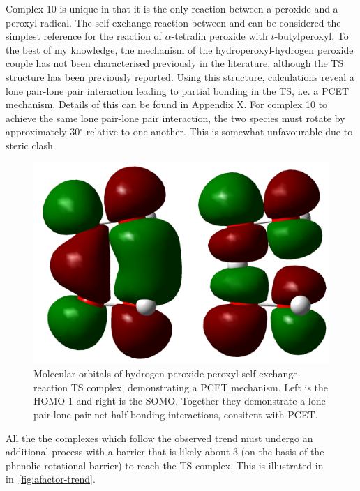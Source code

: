 Complex 10 is unique in that it is the only reaction between a peroxide and a peroxyl radical. The self-exchange reaction between  and  can be considered the simplest reference for the reaction of $\alpha$-tetralin peroxide with $t$-butylperoxyl. To the best of my knowledge, the mechanism of the hydroperoxyl-hydrogen peroxide couple has not been characterised previously in the literature, although the TS structure has been previously reported.\cite{Isborn2005} Using this structure, calculations reveal a lone pair-lone pair interaction leading to partial bonding in the TS, i.e. a PCET mechanism. Details of this can be found in Appendix X. For complex 10 to achieve the same lone pair-lone pair interaction, the two species must rotate by approximately 30$^\circ$ relative to one another. This is somewhat unfavourable due to steric clash.

\begin{figure}[htb]
  \centering
  \includegraphics[width=\textwidth]{figures/hoohooh_TS.png}
  \caption[Molecular orbitals of hydrogen peroxide-peroxyl self-exchange reaction TS complex, demonstrating a PCET mechanism.]{Molecular orbitals of hydrogen peroxide-peroxyl self-exchange reaction TS complex, demonstrating a PCET mechanism. Left is the HOMO-1 and right is the SOMO. Together they demonstrate a lone pair-lone pair net half bonding interactions, consitent with PCET.}
\end{figure}

All the the complexes which follow the observed trend must undergo an additional process with a barrier that is likely about 3 \kcalmol (on the basis of the phenolic rotational barrier) to reach the TS complex. This is illustrated in in~\ref{fig:afactor-trend}.

